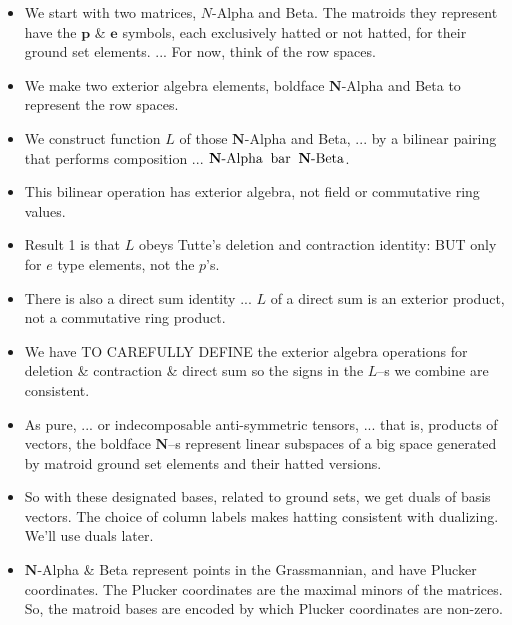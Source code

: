 \documentclass[14pt]{extarticle}
\begin{document}
{\bf
  \begin{itemize}
  \item We start with two matrices, $N$-Alpha and Beta.  The matroids
    they represent have the $\mathbf{p}$ \& $\mathbf{e}$ symbols, each
    exclusively hatted or
    not hatted, for their ground set elements. ...  For now, think of the
    row spaces.

  \item We make two exterior algebra elements,  boldface
    $\mathbf{N}$-Alpha and Beta to represent the row spaces.

  \item We construct function $L$ of those
    $\mathbf{N}$-Alpha and Beta, ... by a bilinear pairing 
    that performs composition ... 
  $\mathbf{N}\text{-Alpha} \text{\;\;bar\;\;} \mathbf{N}\text{-Beta}$.

  \item This bilinear operation has exterior algebra,
    not field or commutative ring values. 

\item Result 1 is that $L$ obeys Tutte's deletion and contraction identity:  BUT
  only for $e$ type elements, not the $p$'s.  

\item There is also a direct sum identity ... $L$ of a direct sum is an exterior product, not
  a commutative ring product.

\item We have TO CAREFULLY DEFINE the exterior algebra operations for deletion \&
  contraction \& direct sum so the signs in the $L$--s we combine are consistent.

\item
  As pure, ... or indecomposable anti-symmetric tensors, ... that is, 
  products of vectors, the boldface
  $\mathbf{N}$--s represent linear subspaces of a big space generated
  by matroid ground set elements and their hatted versions.

\item  So with these designated bases, related to ground sets,
  we get duals of basis vectors.
  The choice of column labels makes hatting consistent with dualizing.
  We'll use duals later.

\item
  $\mathbf{N}$-Alpha \& Beta represent points in the
  Grassmannian, and have Plucker coordinates.
  The Plucker coordinates are the maximal minors of the matrices.
  So, the matroid bases are encoded by which Plucker coordinates are non-zero.


\end{itemize}}
\end{document}
